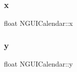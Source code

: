 \subsubsection{\texorpdfstring{x}{x}}
{\footnotesize\ttfamily float N\+G\+U\+I\+Calendar\+::x}

\hypertarget{class_n_g_u_i_calendar_a961351dc4f40e8f4de093c959a9dc6f3}{}\label{class_n_g_u_i_calendar_a961351dc4f40e8f4de093c959a9dc6f3} 
\subsubsection{\texorpdfstring{y}{y}}
{\footnotesize\ttfamily float N\+G\+U\+I\+Calendar\+::y}


